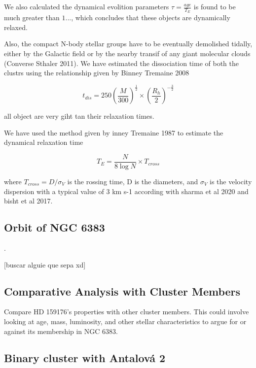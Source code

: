 \documentclass[fleqn,usenatbib,usedcolumn,useAMS]{mnras}
\begin{document}

We also calculated the dynamical evolition parameters $\tau = \frac{age}{T_E}$ is found to be much greater than $1$..., which concludes that these objects are dynamically relaxed. %

Also, the compact N-body stellar groups have to be eventually demolished tidally, either by the Galactic field or by the nearby transif of any giant molecular clouds (Converse Sthaler 2011). We have estimated the dissociation time of both the clustrs using the relationship given by Binney Tremaine 2008

\begin{equation*}
t_{dis} = 250 \left(\frac{M}{300}\right)^{\frac{1}{2}} \times  \left(\frac{R_h}{2}\right)^{-\frac{3}{2}}
\end{equation*}

all object are very giht tan their relaxation times. 

We have used the method given by inney Tremaine 1987 to estimate the dynamical relaxation time 

\begin{equation*}
	T_E = \frac{N}{8 \log N} \times T_{cross}
\end{equation*}

where $T_{cross} = D / \sigma_V$ is the rossing time, D is the diameters, and $\sigma_V$ is the velocity dispersion with a typical value of 3 km s-1 according with sharma et al 2020 and bisht et al 2017.

 \subsection{Orbit of NGC 6383}.

[buscar alguie que sepa xd]

\subsection{Comparative Analysis with Cluster Members}
Compare HD 159176's properties with other cluster members. This could involve looking at age, mass, luminosity, and other stellar characteristics to argue for or against its membership in NGC 6383.

\subsection{Binary cluster with Antalová 2}
\end{document}
